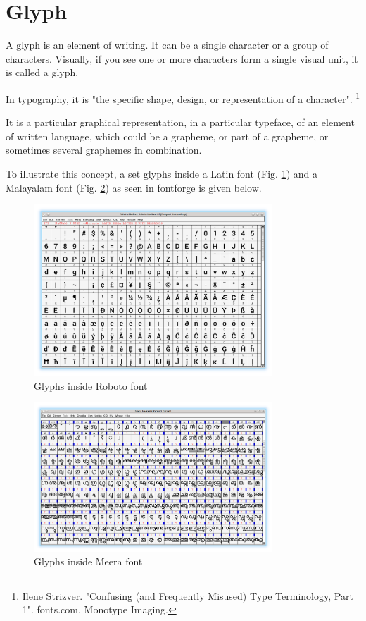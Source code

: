 \section{Glyph }

A glyph is an element of writing. It can be a single character or a group of
characters.
Visually, if you see one or more characters form a single visual unit, it is
called a glyph.

In typography, it is "the specific shape, design, or representation of a
character".
\footnote{Ilene Strizver. "Confusing (and Frequently Misused) Type Terminology,
Part 1". fonts.com. Monotype Imaging.}

It is a particular graphical representation, in a particular typeface, of an
element of written language, which could be a grapheme, or part of a grapheme,
or sometimes several graphemes in combination.

To illustrate this concept, a set glyphs inside a Latin font (Fig.
\ref{Robotoglyph}) and a Malayalam font  (Fig. \ref{Meeraglyph}) as seen in
fontforge is given below.

\begin{figure}[h]
    \centering
    \includegraphics[width=0.8\textwidth]{glyph-fontforge-roboto.png}
    \caption{Glyphs inside Roboto font}
	\label{Robotoglyph}
\end{figure}

\begin{figure}[h]
    \centering
    \includegraphics[width=0.8\textwidth]{glyph-fontforge-meera.png}
    \caption{Glyphs inside Meera font}
	\label{Meeraglyph}
\end{figure}

